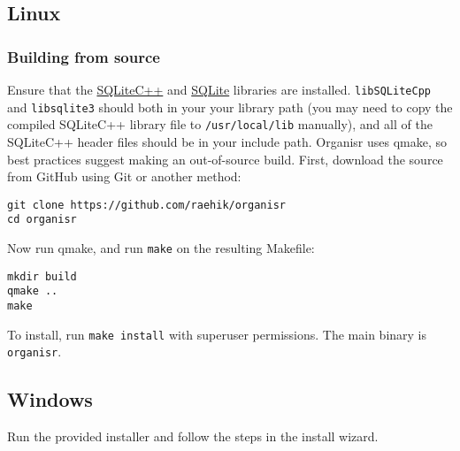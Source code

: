 \subsection{Linux}

\subsubsection{Building from source}

Ensure that the \href{http://srombauts.github.io/SQLiteCpp/}{SQLiteC++} and
\href{http://sqlite.org/download.html}{SQLite} libraries are installed.
\verb|libSQLiteCpp| and \verb|libsqlite3| should both in your your library path
(you may need to copy the compiled SQLiteC++ library file to
\verb|/usr/local/lib| manually), and all of the SQLiteC++ header files should be
in your include path. Organisr uses qmake, so best practices suggest making an
out-of-source build. First, download the source from GitHub using Git or another
method:

\begin{lstlisting}
git clone https://github.com/raehik/organisr
cd organisr
\end{lstlisting}

Now run qmake, and run \verb|make| on the resulting Makefile:

\begin{lstlisting}
mkdir build
qmake ..
make
\end{lstlisting}

To install, run \verb|make install| with superuser permissions. The main binary
is \verb|organisr|.


\subsection{Windows}

Run the provided installer and follow the steps in the install wizard.
